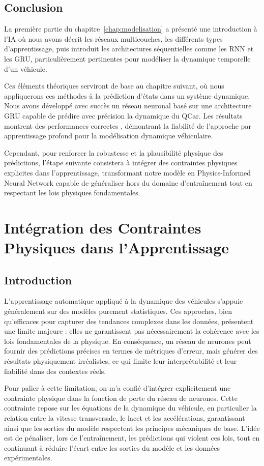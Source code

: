 \documentclass[12pt, a4paper]{report}
\begin{document}
\section{Conclusion}
\label{sec:conclusion}

La première partie du chapitre~\ref{chap:modelisation} a présenté une introduction à l'IA où nous avons décrit les réseaux multicouches, les différents types d’apprentissage, puis introduit les architectures séquentielles comme les RNN et les GRU, particulièrement pertinentes pour modéliser la dynamique temporelle d’un véhicule. 

Ces éléments théoriques serviront de base au chapitre suivant, où nous appliquerons ces méthodes à la prédiction d’états dans un système dynamique.
Nous avons développé avec succès un réseau neuronal basé sur une architecture GRU capable de prédire avec précision la dynamique du QCar. Les résultats montrent des performances correctes , démontrant la fiabilité de l'approche par apprentissage profond pour la modélisation dynamique véhiculaire.

Cependant, pour renforcer la robustesse et la plausibilité physique des prédictions, l'étape suivante consistera à intégrer des contraintes physiques explicites dans l'apprentissage, transformant notre modèle en Physics-Informed Neural Network capable de généraliser hors du domaine d'entraînement tout en respectant les lois physiques fondamentales.


\chapter{Intégration des Contraintes Physiques dans l'Apprentissage}

\section{Introduction}
L’apprentissage automatique appliqué à la dynamique des véhicules s’appuie généralement sur des modèles purement statistiques. Ces approches, bien qu’efficaces pour capturer des tendances complexes dans les données, présentent une limite majeure : elles ne garantissent pas nécessairement la cohérence avec les lois fondamentales de la physique. En conséquence, un réseau de neurones peut fournir des prédictions précises en termes de métriques d’erreur, mais générer des résultats physiquement irréalistes, ce qui limite leur interprétabilité et leur fiabilité dans des contextes réels.

Pour palier à cette limitation, on m'a confié d’intégrer explicitement une contrainte physique dans la fonction de perte du réseau de neurones. Cette contrainte repose sur les équations de la dynamique du véhicule, en particulier la relation entre la vitesse transversale, le lacet et les accélérations, garantissant ainsi que les sorties du modèle respectent les principes mécaniques de base. L’idée est de pénaliser, lors de l’entraînement, les prédictions qui violent ces lois, tout en continuant à réduire l’écart entre les sorties du modèle et les données expérimentales.
\end{document}
